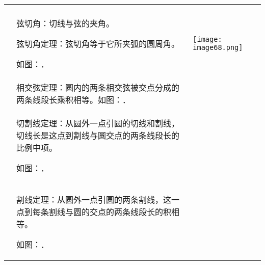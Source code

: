 \begin{longtable}[]{@{}lll@{}}
\toprule
\endhead
& &\tabularnewline
\begin{minipage}[t]{0.30\columnwidth}\raggedright
\strut
\end{minipage} & \begin{minipage}[t]{0.30\columnwidth}\raggedright
弦切角：切线与弦的夹角。

弦切角定理：弦切角等于它所夹弧的圆周角。

如图：．\strut
\end{minipage} & \begin{minipage}[t]{0.30\columnwidth}\raggedright
\texttt{[image: image68.png]}\strut
\end{minipage}\tabularnewline
& 相交弦定理：圆内的两条相交弦被交点分成的两条线段长乘积相等。如图：．
&\tabularnewline
\begin{minipage}[t]{0.30\columnwidth}\raggedright
\strut
\end{minipage} & \begin{minipage}[t]{0.30\columnwidth}\raggedright
切割线定理：从圆外一点引圆的切线和割线，切线长是这点到割线与圆交点的两条线段长的比例中项。

如图：．\strut
\end{minipage} & \begin{minipage}[t]{0.30\columnwidth}\raggedright
\strut
\end{minipage}\tabularnewline
\begin{minipage}[t]{0.30\columnwidth}\raggedright
\strut
\end{minipage} & \begin{minipage}[t]{0.30\columnwidth}\raggedright
割线定理：从圆外一点引圆的两条割线，这一点到每条割线与圆的交点的两条线段长的积相等。

如图：．\strut
\end{minipage} & \begin{minipage}[t]{0.30\columnwidth}\raggedright
\strut
\end{minipage}\tabularnewline
\bottomrule
\end{longtable}

\hypertarget{section-19}{%
\subsubsection{}\label{section-19}}

